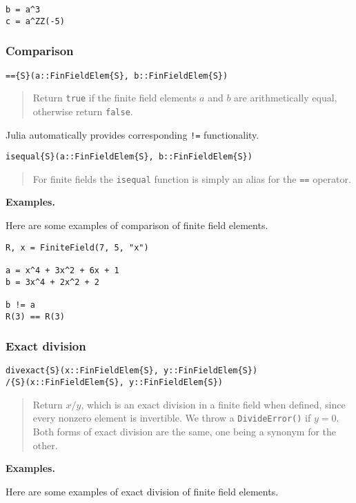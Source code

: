 \documentclass[a4paper,10pt]{article}
\newcommand{\code}{\lstinline}
\newcommand{\desc}[1]{\vspace{-3mm}\begin{quote}#1\end{quote}}
\begin{document}
{{\begin{lstlisting}
b = a^3
c = a^ZZ(-5)
\end{lstlisting}

\subsubsection{Comparison}

\begin{lstlisting}
=={S}(a::FinFieldElem{S}, b::FinFieldElem{S})
\end{lstlisting}

\desc{Return \code{true} if the finite field elements $a$ and $b$ are 
arithmetically equal, otherwise return \code{false}.}

Julia automatically provides corresponding \code{!=} functionality.

\begin{lstlisting}
isequal{S}(a::FinFieldElem{S}, b::FinFieldElem{S})
\end{lstlisting}

\desc{For finite fields the \code{isequal} function is simply an alias for
the \code{==} operator.}

\textbf{Examples.}

Here are some examples of comparison of finite field elements.

\begin{lstlisting}
R, x = FiniteField(7, 5, "x")

a = x^4 + 3x^2 + 6x + 1
b = 3x^4 + 2x^2 + 2

b != a
R(3) == R(3)
\end{lstlisting}

\subsubsection{Exact division}

\begin{lstlisting}
divexact{S}(x::FinFieldElem{S}, y::FinFieldElem{S})
/{S}(x::FinFieldElem{S}, y::FinFieldElem{S})
\end{lstlisting}

\desc{Return $x/y$, which is an exact division in a finite field when defined,
since every nonzero element is invertible. We throw a \code{DivideError()} if
$y = 0$. Both forms of exact division are the same, one being a synonym for 
the other.}

\textbf{Examples.}

Here are some examples of exact division of finite field elements.

}}
\end{document}
